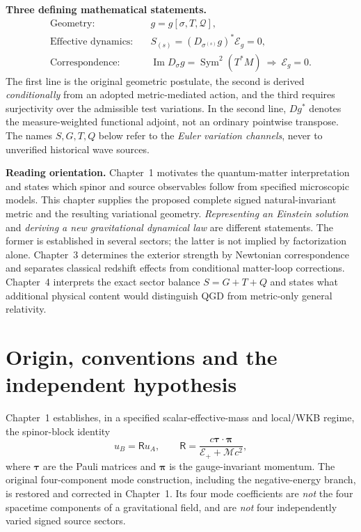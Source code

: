 \documentclass[11pt,a4paper]{article}
\newcommand{\mc}{\mathcal M}
\begin{document}
\medskip
\noindent\textbf{Three defining mathematical statements.}
\begin{equation}\label{eq:qgd062-three-pillars}
\boxed{\begin{aligned}
\text{Geometry:}\quad& g=g[\sigma,T,\mathcal Q],\\
\text{Effective dynamics:}\quad& S_{(s)}=(D_{\sigma^{(s)}}g)^{*}\mathcal E_g=0,\\
\text{Correspondence:}\quad& \operatorname{Im}D_\sigma g=\operatorname{Sym}^2(T^*M)
\ \Longrightarrow\ \mathcal E_g=0.
\end{aligned}}
\end{equation}
The first line is the original geometric postulate, the second is derived
\emph{conditionally} from an adopted metric-mediated action, and the third
requires surjectivity over the admissible test variations. In the second line,
$Dg^{*}$ denotes the measure-weighted functional adjoint, not an
ordinary pointwise transpose. The names $S,G,T,Q$ below refer to the
\emph{Euler variation channels}, never to unverified historical wave sources.


\tableofcontents

\noindent\textbf{Reading orientation.}
Chapter~1 motivates the quantum-matter interpretation and states which
spinor and source observables follow from specified microscopic models.
This chapter supplies the proposed complete signed natural-invariant
metric and the resulting variational geometry.  \emph{Representing an
Einstein solution} and \emph{deriving a new gravitational dynamical law}
are different statements.  The former is established in several sectors;
the latter is not implied by factorization alone.  Chapter~3 determines
the exterior strength by Newtonian correspondence and separates classical
redshift effects from conditional matter-loop corrections.  Chapter~4
interprets the exact sector balance $S=G+T+Q$ and states what additional
physical content would distinguish QGD from metric-only general relativity.

\section{Origin, conventions and the independent hypothesis}\label{sec:origin}
Chapter~1 establishes, in a specified scalar-effective-mass and local/WKB regime, the spinor-block identity
\begin{equation}\label{eq:origin-ratio}
 u_B=\mathsf R u_A,\qquad
 \mathsf R=\frac{c\bm\tau\cdot\bm\pi}{\mathcal E_++\mc c^2},
\end{equation}
where $\bm\tau$ are the Pauli matrices and $\bm\pi$ is the gauge-invariant momentum. The original four-component mode construction, including the negative-energy branch, is restored and corrected in Chapter~1. Its four mode coefficients are \emph{not} the four spacetime components of a gravitational field, and are \emph{not} four independently varied signed source sectors.
\end{document}
